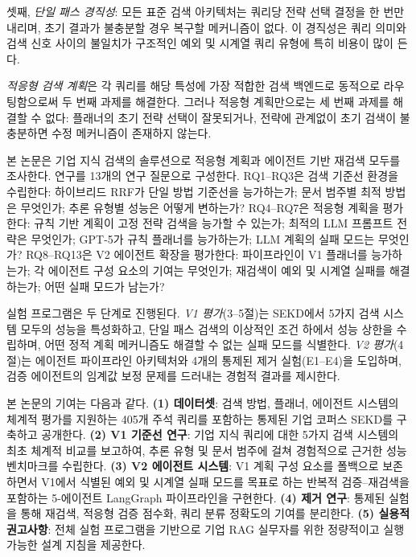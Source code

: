\documentclass[11pt, a4paper]{article}
\begin{document}
셋째, \emph{단일 패스 경직성}: 모든 표준 검색 아키텍처는 쿼리당 전략 선택 결정을 한 번만 내리며, 초기 결과가 불충분할 경우 복구할 메커니즘이 없다. 이 경직성은 쿼리 의미와 검색 신호 사이의 불일치가 구조적인 예외 및 시계열 쿼리 유형에 특히 비용이 많이 든다.

\emph{적응형 검색 계획}은 각 쿼리를 해당 특성에 가장 적합한 검색 백엔드로 동적으로 라우팅함으로써 두 번째 과제를 해결한다. 그러나 적응형 계획만으로는 세 번째 과제를 해결할 수 없다: 플래너의 초기 전략 선택이 잘못되거나, 전략에 관계없이 초기 검색이 불충분하면 수정 메커니즘이 존재하지 않는다.

본 논문은 기업 지식 검색의 솔루션으로 적응형 계획과 에이전트 기반 재검색 모두를 조사한다. 연구를 13개의 연구 질문으로 구성한다. RQ1--RQ3은 검색 기준선 환경을 수립한다: 하이브리드 RRF가 단일 방법 기준선을 능가하는가; 문서 범주별 최적 방법은 무엇인가; 추론 유형별 성능은 어떻게 변하는가? RQ4--RQ7은 적응형 계획을 평가한다: 규칙 기반 계획이 고정 전략 검색을 능가할 수 있는가; 최적의 LLM 프롬프트 전략은 무엇인가; GPT-5가 규칙 플래너를 능가하는가; LLM 계획의 실패 모드는 무엇인가? RQ8--RQ13은 V2 에이전트 확장을 평가한다: 파이프라인이 V1 플래너를 능가하는가; 각 에이전트 구성 요소의 기여는 무엇인가; 재검색이 예외 및 시계열 실패를 해결하는가; 어떤 실패 모드가 남는가?

실험 프로그램은 두 단계로 진행된다. \emph{V1 평가}(3--5절)는 SEKD에서 5가지 검색 시스템 모두의 성능을 특성화하고, 단일 패스 검색의 이상적인 조건 하에서 성능 상한을 수립하며, 어떤 정적 계획 메커니즘도 해결할 수 없는 실패 모드를 식별한다. \emph{V2 평가}(4절)는 에이전트 파이프라인 아키텍처와 4개의 통제된 제거 실험(E1--E4)을 도입하며, 검증 에이전트의 임계값 보정 문제를 드러내는 경험적 결과를 제시한다.

본 논문의 기여는 다음과 같다. \textbf{(1) 데이터셋}: 검색 방법, 플래너, 에이전트 시스템의 체계적 평가를 지원하는 405개 주석 쿼리를 포함하는 통제된 기업 코퍼스 SEKD를 구축하고 공개한다. \textbf{(2) V1 기준선 연구}: 기업 지식 쿼리에 대한 5가지 검색 시스템의 최초 체계적 비교를 보고하여, 추론 유형 및 문서 범주에 걸쳐 경험적으로 근거한 성능 벤치마크를 수립한다. \textbf{(3) V2 에이전트 시스템}: V1 계획 구성 요소를 폴백으로 보존하면서 V1에서 식별된 예외 및 시계열 실패 모드를 목표로 하는 반복적 검증--재검색을 포함하는 5-에이전트 LangGraph 파이프라인을 구현한다. \textbf{(4) 제거 연구}: 통제된 실험을 통해 재검색, 적응형 검증 점수화, 쿼리 분류 정확도의 기여를 분리한다. \textbf{(5) 실용적 권고사항}: 전체 실험 프로그램을 기반으로 기업 RAG 실무자를 위한 정량적이고 실행 가능한 설계 지침을 제공한다.
\end{document}
